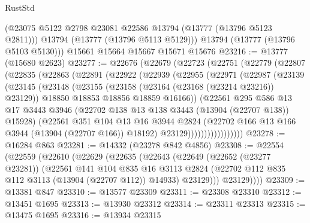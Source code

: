 \begin{lexlean}{RustStd}
\begin{coremodule}
        (@23075 @5122 @2798 @23081 @22586 @13794 (@13777 (@13796 @5123 @2811)))
        @13794
        (@13777 (@13796 @5113 @5129)))
      @13794
      (@13777 (@13796 @5103 @5130)))
    @15661
    @15664
    @15667
    @15671
    @15676
@23216 := @13777 (@15680 @2623)
@23277 := @22676
    (@22679
      (@22723
        (@22751
          (@22779
            (@22807
              (@22835
                (@22863
                  (@22891
                    (@22922
                      (@22939
                        (@22955
                          (@22971
                            (@22987
                              (@23139
                                (@23145
                                  (@23148
                                    (@23155
                                      (@23158 (@23164 (@23168 (@23214 @23216)) @23129))
                                      @18850
                                      @18853
                                      @18856
                                      @18859
                                      @16166))
                                  (@22561
                                    @295
                                    @586
                                    @13
                                    @17
                                    @3443
                                    @3946
                                    (@22702 @138 @13 @138 @3443 (@13904 (@22707 @138)) @15928)
                                    (@22561
                                      @351
                                      @104
                                      @13
                                      @16
                                      @3944
                                      @2824
                                      (@22702 @166 @13 @166 @3944 (@13904 (@22707 @166)) @18192)
                                      @23129)))))))))))))))))
@23278 := @16284 @863
@23281 := @14332 (@23278 @842 @4856)
@23308 := @22554
    (@22559
      (@22610
        (@22629
          (@22635
            (@22643
              (@22649
                (@22652 (@23277 @23281))
                (@22561
                  @141
                  @104
                  @835
                  @16
                  @3113
                  @2824
                  (@22702 @112 @835 @112 @3113 (@13904 (@22707 @112)) @14933)
                  @23129)))
            @23129))))
@23309 := @13381 @847
@23310 := @13577 @23309
@23311 := @23308 @23310
@23312 := @13451 @1695
@23313 := @13930 @23312
@23314 := @23311 @23313
@23315 := @13475 @1695
@23316 := @13934 @23315

\end{coremodule}
\end{lexlean}
